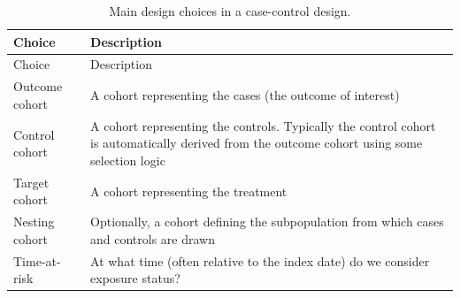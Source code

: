 \documentclass[11pt]{book}
\theoremstyle{definition}
\theoremstyle{definition}
\theoremstyle{definition}
\theoremstyle{remark}
\begin{document}
\begin{longtable}[]{@{}ll@{}}
\caption{\label{tab:ccChoices} Main design choices in a case-control design.}\tabularnewline
\toprule
\begin{minipage}[b]{0.22\columnwidth}\raggedright
Choice\strut
\end{minipage} & \begin{minipage}[b]{0.72\columnwidth}\raggedright
Description\strut
\end{minipage}\tabularnewline
\midrule
\endfirsthead
\toprule
\begin{minipage}[b]{0.22\columnwidth}\raggedright
Choice\strut
\end{minipage} & \begin{minipage}[b]{0.72\columnwidth}\raggedright
Description\strut
\end{minipage}\tabularnewline
\midrule
\endhead
\begin{minipage}[t]{0.22\columnwidth}\raggedright
Outcome cohort\strut
\end{minipage} & \begin{minipage}[t]{0.72\columnwidth}\raggedright
A cohort representing the cases (the outcome of interest)\strut
\end{minipage}\tabularnewline
\begin{minipage}[t]{0.22\columnwidth}\raggedright
Control cohort\strut
\end{minipage} & \begin{minipage}[t]{0.72\columnwidth}\raggedright
A cohort representing the controls. Typically the control cohort is automatically derived from the outcome cohort using some selection logic\strut
\end{minipage}\tabularnewline
\begin{minipage}[t]{0.22\columnwidth}\raggedright
Target cohort\strut
\end{minipage} & \begin{minipage}[t]{0.72\columnwidth}\raggedright
A cohort representing the treatment\strut
\end{minipage}\tabularnewline
\begin{minipage}[t]{0.22\columnwidth}\raggedright
Nesting cohort\strut
\end{minipage} & \begin{minipage}[t]{0.72\columnwidth}\raggedright
Optionally, a cohort defining the subpopulation from which cases and controls are drawn\strut
\end{minipage}\tabularnewline
\begin{minipage}[t]{0.22\columnwidth}\raggedright
Time-at-risk\strut
\end{minipage} & \begin{minipage}[t]{0.72\columnwidth}\raggedright
At what time (often relative to the index date) do we consider exposure status?\strut
\end{minipage}\tabularnewline
\bottomrule
\end{longtable}
\end{document}
